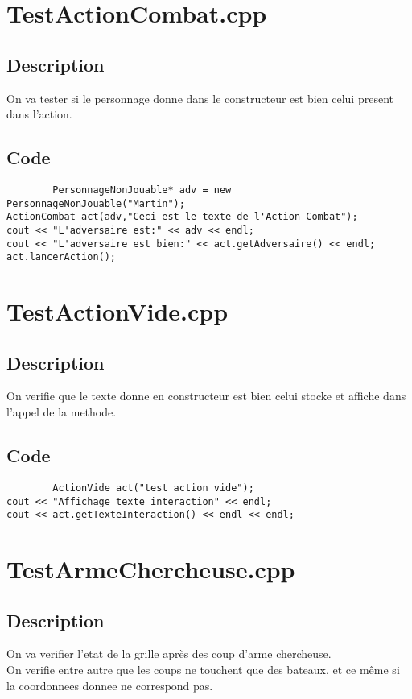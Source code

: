     \section{TestActionCombat.cpp}
        \subsection{Description}
            On va tester si le personnage donne dans le constructeur est bien celui present dans l'action.
        \subsection{Code}
	\begin{lstlisting}
		PersonnageNonJouable* adv = new PersonnageNonJouable("Martin");
ActionCombat act(adv,"Ceci est le texte de l'Action Combat");
cout << "L'adversaire est:" << adv << endl;
cout << "L'adversaire est bien:" << act.getAdversaire() << endl;
act.lancerAction();
	\end{lstlisting}
    \section{TestActionVide.cpp}
        \subsection{Description}
            On verifie que le texte donne en constructeur est bien celui stocke et affiche dans l'appel de la methode.
        \subsection{Code}
	\begin{lstlisting}
		ActionVide act("test action vide");
cout << "Affichage texte interaction" << endl;
cout << act.getTexteInteraction() << endl << endl;
	\end{lstlisting}
    \section{TestArmeChercheuse.cpp}
        \subsection{Description}
            On va verifier l'etat de la grille après des coup d'arme chercheuse.\\
            On verifie entre autre que les coups ne touchent que des bateaux, et ce même si la coordonnees donnee ne correspond pas.
